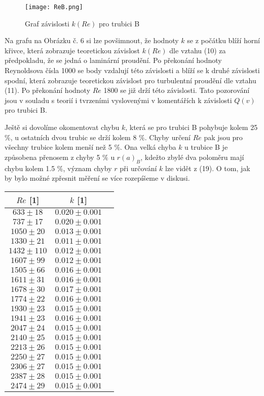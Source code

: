 \documentclass[a4paper]{article}
\begin{document}
\begin{figure}[H]
\centering
\texttt{[image: ReB.png]}
\caption{Graf závislosti $k(Re)$ pro trubici B}
\end{figure}
\par Na grafu na Obrázku č. 6 si lze povšimnout, že hodnoty $k$ se z počátku blíží horní křivce, která zobrazuje teoretickou závislost $k(Re)$ dle vztahu (10) za předpokladu, že se jedná o laminární proudění. Po překonání hodnoty Reynoldsova čísla 1000 se body vzdalují této závislosti a blíží se k druhé závislosti spodní, která zobrazuje teoretickou závislost pro turbulentní proudění dle vztahu (11). Po překonání hodnoty $Re$ 1800 se již drží této závislosti. Tato pozorování jsou v souladu s teorií i tvrzeními vyslovenými v komentářích k závislosti $Q(v)$ pro trubici B.
\par Ještě si dovolíme okomentovat chybu $k$, která se pro trubici B pohybuje kolem 25 $\%$, u ostatních dvou trubic se drží kolem 8 $\%$. Chyby určení $Re$ pak jsou pro všechny trubice kolem menší než 5 $\%$. Ona velká chyba $k$ u trubice B je způsobena přenosem z chyby 5 $\%$ u $r(a)_{B}$, kdežto zbylé dva poloměru mají chybu kolem 1.5 $\%$, význam chyby  $r$ při určování $k$ lze vidět z (19). O tom, jak by bylo možné zpřesnit měření se více rozepíšeme v diskusi.
\newpage
\begin{center}
    \label{tab:title}
    \begin{tabular}{ | c | c |  p{3cm} |} \hline
    $Re$ [1] & $k$ [1]    \\ \hline
    $633  \pm 18$  & $0.020\pm0.001$ \\ \hline
    $737  \pm 17$  & $0.020\pm0.001$ \\ \hline
    $1050 \pm 20$  & $0.013\pm0.001$ \\ \hline
    $1330 \pm 21$  & $0.011\pm0.001$ \\ \hline
    $1432 \pm 110$ & $0.012\pm0.001$ \\ \hline
    $1607 \pm 99$  & $0.012\pm0.001$ \\ \hline
    $1505 \pm 66$  & $0.016\pm0.001$ \\ \hline
    $1611 \pm 31$  & $0.016\pm0.001$ \\ \hline
    $1678 \pm 30$  & $0.017\pm0.001$ \\ \hline
    $1774 \pm 22$  & $0.016\pm0.001$ \\ \hline
    $1930 \pm 23$  & $0.015\pm0.001$ \\ \hline
    $1941 \pm 23$  & $0.016\pm0.001$ \\ \hline
    $2047 \pm 24$  & $0.015\pm0.001$ \\ \hline
    $2140 \pm 25$  & $0.015\pm0.001$ \\ \hline
    $2213 \pm 26$  & $0.015\pm0.001$ \\ \hline
    $2250 \pm 27$  & $0.015\pm0.001$ \\ \hline
    $2306 \pm 27$  & $0.015\pm0.001$ \\ \hline
    $2387 \pm 28$  & $0.015\pm0.001$ \\ \hline
    $2474\pm29$  & $0.015\pm0.001$ \\ \hline
\end{tabular}
\end{center}
\end{document}
